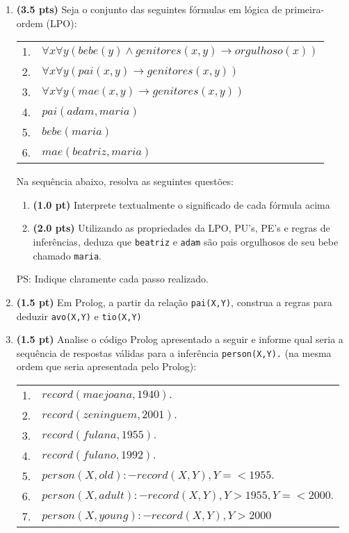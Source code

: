 \documentclass[a4paper,12pt]{article}
\begin{document}
\begin{enumerate}
\item {\bf (3.5 pts)} Seja o conjunto das seguintes fórmulas em lógica de primeira-ordem (LPO):\\
\begin{center}
\begin{tabular}{ll}
 \hline \hline
    1. &  $\forall x\forall y (bebe(y) \wedge genitores(x,y) \rightarrow orgulhoso(x)) $ \\
    2. &  $\forall x\forall y ( pai(x,y) \rightarrow genitores(x,y) ) $ \\
    3. &  $\forall x\forall y ( mae(x,y) \rightarrow genitores(x,y) ) $ \\
    4. &  $ pai(adam, maria) $ \\
    5. &  $ bebe(maria) $ \\
    6. &  $ mae(beatriz, maria) $ \\ \hline \hline
 \end{tabular}
\end{center}
 
Na sequência abaixo, resolva as seguintes questões:
\begin{enumerate}
\setlength{\itemsep}{-3pt}
\item {\bf (1.0 pt)} Interprete textualmente o significado de cada fórmula acima
\item {\bf (2.0 pts)} Utilizando as propriedades da LPO, PU's, PE's e regras de inferências, deduza que \texttt{beatriz} e \texttt{adam}
são pais orgulhosos de seu bebe chamado \texttt{maria}.
\end{enumerate}
PS: Indique claramente cada passo realizado.

\item {\bf (1.5 pt)} Em Prolog, a partir da relação \texttt{pai(X,Y)}, construa a regras para deduzir \texttt{avo(X,Y)} e \texttt{tio(X,Y)}

\item {\bf (1.5 pt)} Analise o código Prolog apresentado a seguir e informe qual seria a sequência de respostas válidas para a inferência {\tt person(X,Y).} {\small (na mesma ordem que seria apresentada pelo Prolog)}:

\begin{center}
\begin{tabular}{ll}
 \hline \hline
    1. &  $record(maejoana,1940).$ \\
    2. &  $record(zeninguem, 2001).$ \\
    3. &  $record(fulana,1955).$ \\
    4. &  $record(fulano, 1992).$\\
    5. &  $person(X,old) :- record(X,Y), Y=<1955.$ \\
    6. &  $person(X,adult) :- record(X,Y), Y>1955, Y=<2000.$ \\
    7. &  $person(X,young) :- record(X,Y), Y>2000$ \\ \hline \hline
 \end{tabular}
\end{center}


\end{enumerate}
\end{document}
